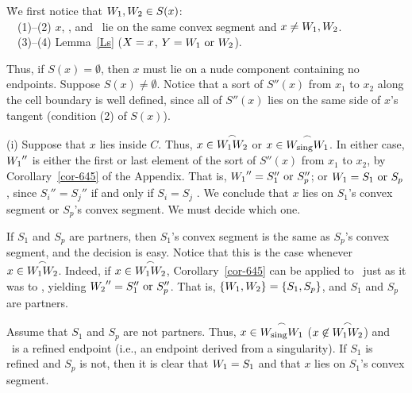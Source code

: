 \begin{tabbing}
\indent \= We first notice that $\mbox{$W_{1}$},\mbox{$W_{2}$} \in S(x)$:\\
\> \ \ (1)--(2) $x$, \wo, and \wt\ lie on the same convex segment and $x \neq \mbox{$W_{1}$},\mbox{$W_{2}$}$.\\
\> \ \ (3)--(4) Lemma~\ref{Ls} ($X = x$, $Y = \mbox{$W_{1}$} \mbox{ or } \mbox{$W_{2}$}$).
\end{tabbing}

\noindent Thus, if $S(x) = \emptyset$, then $x$ must lie on a nude component containing 
no endpoints.
%
%
Suppose $S(x) \neq \emptyset$.
Notice that a sort of $S''(x)$ 
from $x_{1}$ to $x_{2}$ along the cell boundary is well defined, 
since all of $S''(x)$ lies on the same side of $x$'s tangent
(condition (2) of $S(x)$).

(i) Suppose that $x$ lies inside $C$.
Thus, $x \in \mbox{$\stackrel{\frown}{\mbox{$W_{1}$}\mbox{$W_{2}$}}$}$ or $x \in \mbox{$\stackrel{\frown}{W_{\mbox{\footnotesize{sing}}}\mbox{$W_{1}$}}$}$.
In either case, 
$\mbox{$W_{1}$}''$ is either the first or last element of the sort of $S''(x)$
from $x_{1}$ to $x_{2}$, by Corollary~\ref{cor-645} of the Appendix.
That is, $\mbox{$W_{1}$}'' = S_{1}'' \mbox{ or } S_{p}''$; or
$\mbox{$W_{1}$} = S_{1} \mbox{ or } S_{p}$, 
since $S_{i}'' = S_{j}''$ if and only if $S_{i}=S_{j}$ \cite[p. 75]{jj}.
We conclude that $x$ lies on $S_{1}$'s convex segment or 
$S_{p}$'s convex segment.
We must decide which one.

If $S_{1}$ and $S_{p}$ are partners, then $S_{1}$'s convex segment is the same as
$S_{p}$'s convex segment, and the decision is easy.
Notice that this is the case whenever $x \in \mbox{$\stackrel{\frown}{\mbox{$W_{1}$}\mbox{$W_{2}$}}$}$.
Indeed, if $x \in \mbox{$\stackrel{\frown}{\mbox{$W_{1}$}\mbox{$W_{2}$}}$}$,
Corollary~\ref{cor-645} can be applied to \wt\ just as it was to \wo, yielding
$\mbox{$W_{2}$}'' = S_{1}'' \mbox{ or } S_{p}''$.
That is, $\{\mbox{$W_{1}$},\mbox{$W_{2}$}\} = \{S_{1},S_{p}\}$, and $S_{1}$ and $S_{p}$ are partners.

Assume that $S_{1}$ and $S_{p}$ are not partners.
Thus, $x \in \mbox{$\stackrel{\frown}{W_{\mbox{\footnotesize{sing}}}\mbox{$W_{1}$}}$}$ ($x \not\in \mbox{$\stackrel{\frown}{\mbox{$W_{1}$}\mbox{$W_{2}$}}$}$)
and  \wo\ is a refined endpoint (i.e., an endpoint derived from a singularity).
If $S_{1}$ is refined and $S_{p}$ is not, then it is clear that $\mbox{$W_{1}$} = S_{1}$ and that
$x$ lies on $S_{1}$'s convex segment.

